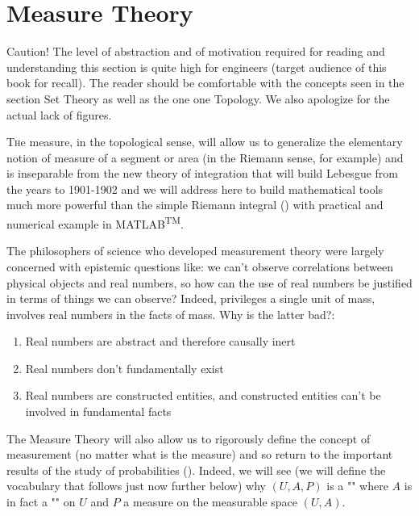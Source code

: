 	\newpage
	\thispagestyle{empty}
	\mbox{}
	\section{Measure Theory}
	\begin{tcolorbox}[colback=red!5,borderline={1mm}{2mm}{red!5},arc=0mm,boxrule=0pt]
	\bcbombe Caution! The level of abstraction and of motivation required for reading and understanding this section is quite high for engineers (target audience of this book for recall). The reader should be comfortable with the concepts seen in the section Set Theory as well as the one one Topology. We also apologize for the actual lack of figures. 
	\end{tcolorbox}
	\lettrine[lines=4]{\color{BrickRed}T}he measure, in the topological sense, will allow us to generalize the elementary notion of measure of a segment or area (in the Riemann sense, for example) and is inseparable from the new theory of integration that will build Lebesgue from the years to 1901-1902 and we will address here to build mathematical tools much more powerful than the simple Riemann integral () with practical and numerical example in MATLAB\textsuperscript{TM}.
	
	The philosophers of science who developed measurement theory were largely concerned with epistemic questions like: we can't observe correlations between physical objects and real numbers, so how can the use of real numbers be justified in terms of things we can observe? Indeed, privileges a single unit of mass, involves real numbers in the facts of
mass. Why is the latter bad?: 
	\begin{enumerate}
		\item Real numbers are abstract and therefore causally inert
		
		\item Real numbers don't fundamentally exist
		
		\item Real numbers are constructed entities, and constructed entities can't be involved  in fundamental facts
	\end{enumerate}

	The Measure Theory will also allow us to rigorously define the concept of measurement (no matter what is the measure) and so return to the important results of the study of probabilities (). Indeed, we will see (we will define the vocabulary that follows just now further below) why $(U, A, P)$ is a "" where $A$ is in fact a "" on $U$ and $P$ a measure on the measurable space $(U , A)$.
	

